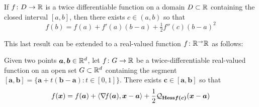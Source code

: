 \begin{theorem}
If $f\colon D \to \mathbb{R}$ is a twice differentiable function on a domain $D \subset \mathbb{R}$ containing the closed interval $[a,b]$, then there exists $c \in (a,b)$ so that 
\begin{equation*}
f(b) = f(a) + f'(a)(b-a) + \tfrac{1}{2}f''(c)(b-a)^2
\end{equation*}
\end{theorem}

This last result can be extended to a real-valued function $f \colon \mathbb{R}^ \to \mathbb{R}$ as follows:

\begin{theorem}[Taylor]\label{theorem:Taylor}
Given two points $\boldsymbol{a}, \boldsymbol{b} \in \mathbb{R}^d$, let $f\colon G \to \mathbb{R}$ be a twice-differentiable real-valued function on an open set $G \subset \mathbb{R}^d$ containing the segment $[\boldsymbol{a}, \boldsymbol{b}] = \{ \boldsymbol{a} + t (\boldsymbol{b} - \boldsymbol{a}) : t \in [0,1] \}$.  There exists $\boldsymbol{c} \in [\boldsymbol{a}, \boldsymbol{b}]$ so that 
\begin{equation*}
f(\boldsymbol{x}) = f(\boldsymbol{a}) + \langle \mathop{\nabla\! {f}}(\boldsymbol{a}), \boldsymbol{x} - \boldsymbol{a} \rangle + \frac{1}{2} \mathcal{Q}_{\boldsymbol{\mathop{\mathrm{Hess}{f}}(c)}} (\boldsymbol{x}-\boldsymbol{a})
\end{equation*}
\end{theorem}




